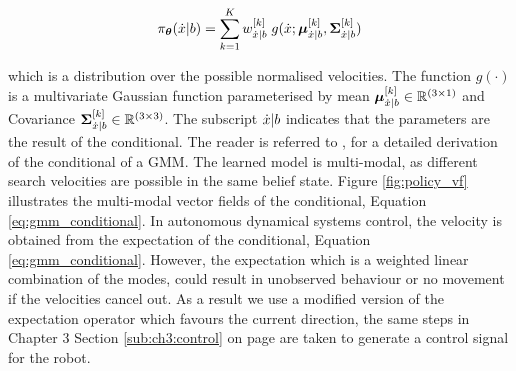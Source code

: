 \begin{equation}\label{eq:gmm_conditional}
 \pi_{\boldsymbol{\theta}}(\dot{x}|b) = \sum_{k=1}^{K} w^{[k]}_{\dot{x}|b} \; g(\dot{x};\boldsymbol{\mu}^{[k]}_{\dot{x}|b},\boldsymbol{\Sigma}^{[k]}_{\dot{x}|b}) 
 \end{equation}

\noindent which is a distribution over the possible normalised velocities. The function $g(\cdot)$ is a multivariate
Gaussian function parameterised by mean $\boldsymbol{\mu}^{[k]}_{\dot{x}|b} \in \mathbb{R}^{(3\times1)}$ and Covariance $\boldsymbol{\Sigma}^{[k]}_{\dot{x}|b} \in \mathbb{R}^{(3\times3)}$. The subscript $\dot{x}|b$ indicates that the parameters 
are the result of the conditional. The reader is referred to \cite{gesture_calinon_2010}, \cite{gmr_2004} for 
a detailed derivation of the conditional of a GMM. The learned model 
is multi-modal, as different search velocities are possible 
in the same belief state. Figure \ref{fig:policy_vf} illustrates the multi-modal 
vector fields of the conditional, Equation \ref{eq:gmm_conditional}.
In autonomous dynamical systems control, the velocity is obtained from 
the expectation of the conditional, Equation \ref{eq:gmm_conditional}. However, the expectation which is a weighted 
linear combination of the modes, could result in unobserved behaviour or no movement if the velocities cancel out. 
As a result we use a modified version of the expectation operator which favours the current
direction, the same steps in Chapter 3 Section \ref{sub:ch3:control} on page \pageref{sub:ch3:control} are taken to 
generate a control signal for the robot.

